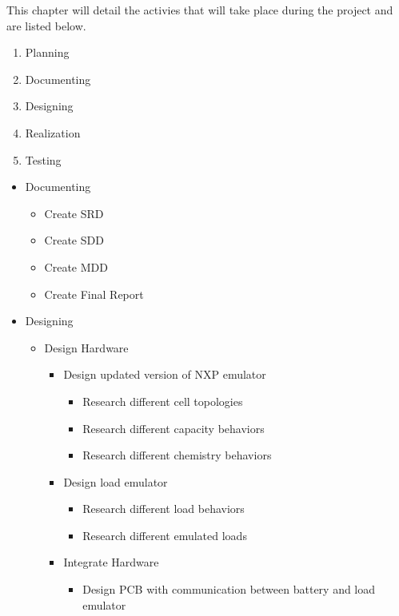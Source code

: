 This chapter will detail the activies that will take place during the project and are listed below. 

\begin{enumerate}
    \item Planning 
    \item Documenting
    \item Designing 
    \item Realization
    \item Testing
\end{enumerate}


\begin{itemize}
    \item Documenting
    \begin{itemize}
    \item Create SRD
    \item Create SDD
    \item Create MDD
    \item Create Final Report
    \end{itemize}

    \item Designing
    \begin{itemize}
        \item Design Hardware
        \begin{itemize}
            \item Design updated version of NXP emulator
            \begin{itemize}
                \item Research different cell topologies 
                \item Research different capacity behaviors 
                \item Research different chemistry behaviors 
            \end{itemize}
            \item Design load emulator 
            \begin{itemize}
                \item Research different load behaviors 
                \item Research different emulated loads 
            \end{itemize}
            \item Integrate Hardware
            \begin{itemize}
                \item Design PCB with communication between battery and load emulator
            \end{itemize}
        

\end{itemize}
\end{itemize}
\end{itemize}
